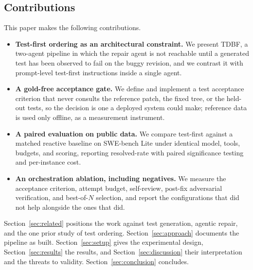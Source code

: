 \subsection{Contributions}
\label{sec:intro-contributions}

This paper makes the following contributions.

\begin{itemize}
  \item \textbf{Test-first ordering as an architectural constraint.} We present
  TDBF, a two-agent pipeline in which the repair agent is not reachable until a
  generated test has been observed to fail on the buggy revision, and we
  contrast it with prompt-level test-first instructions inside a single agent.
  \item \textbf{A gold-free acceptance gate.} We define and implement a test
  acceptance criterion that never consults the reference patch, the fixed tree,
  or the held-out tests, so the decision is one a deployed system could make;
  reference data is used only offline, as a measurement instrument.
  \item \textbf{A paired evaluation on public data.} We compare test-first
  against a matched reactive baseline on SWE-bench Lite under identical model,
  tools, budgets, and scoring, reporting resolved-rate with paired significance
  testing and per-instance cost.
  \item \textbf{An orchestration ablation, including negatives.} We measure the
  acceptance criterion, attempt budget, self-review, post-fix adversarial
  verification, and best-of-$N$ selection, and report the configurations that
  did not help alongside the ones that did.
\end{itemize}

Section~\ref{sec:related} positions the work against test generation, agentic
repair, and the one prior study of test ordering.
Section~\ref{sec:approach} documents the pipeline as built.
Section~\ref{sec:setup} gives the experimental design,
Section~\ref{sec:results} the results, and
Section~\ref{sec:discussion} their interpretation and the threats to validity.
Section~\ref{sec:conclusion} concludes.

